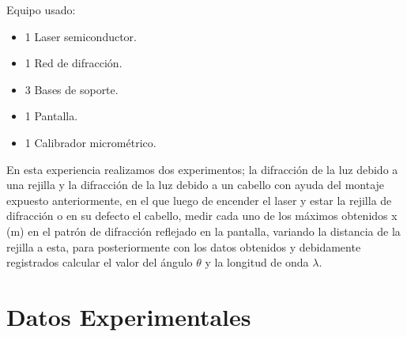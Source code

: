 \documentclass[twocolumn, 12pt]{article}
\begin{document}
Equipo usado:

\begin{itemize}[label=$\triangleright$]
      \item 1 Laser semiconductor.
      \item 1 Red de difracción.
      \item 3 Bases de soporte.
      \item 1 Pantalla.
      \item 1 Calibrador micrométrico.
\end{itemize}

En esta experiencia realizamos dos experimentos; la
difracción de la luz debido a una rejilla y la difracción
de la luz debido a un cabello con ayuda del montaje
expuesto anteriormente, en el que luego de encender el
laser y estar la rejilla de difracción o en su defecto el
cabello, medir cada uno de los máximos obtenidos x (m) en
el patrón de difracción reflejado en la pantalla, variando
la distancia de la rejilla a esta, para posteriormente con
los datos obtenidos y debidamente registrados calcular el
valor del ángulo $\theta$ y la longitud de onda $\lambda$.

\section{Datos Experimentales}
\end{document}
